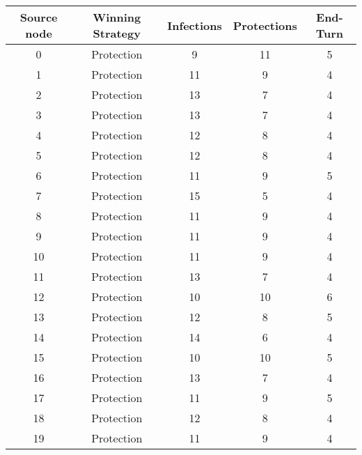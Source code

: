 \documentclass[results.tex]{subfiles}
\begin{document}
\begin{center}
  \begin{tabular}{| c || c | c | c | c |}
    \hline
    {\bfseries Source node} & {\bfseries Winning Strategy} & {\bfseries Infections} & {\bfseries Protections} & {\bfseries End-Turn} \\  %
    \hline\hline
    0 & Protection & 9 & 11 & 5 \\
    \hline
    1 & Protection & 11 & 9 & 4 \\
    \hline
    2 & Protection & 13 & 7 & 4 \\
    \hline
    3 & Protection & 13 & 7 & 4 \\
    \hline
    4 & Protection & 12 & 8 & 4 \\
    \hline
    5 & Protection & 12 & 8 & 4 \\
    \hline
    6 & Protection & 11 & 9 & 5 \\
    \hline
    7 & Protection & 15 & 5 & 4 \\
    \hline
    8 & Protection & 11 & 9 & 4 \\
    \hline
    9 & Protection & 11 & 9 & 4 \\
    \hline
    10 & Protection & 11 & 9 & 4 \\
    \hline
    11 & Protection & 13 & 7 & 4 \\
    \hline
    12 & Protection & 10 & 10 & 6 \\
    \hline
    13 & Protection & 12 & 8 & 5 \\
    \hline
    14 & Protection & 14 & 6 & 4 \\
    \hline
    15 & Protection & 10 & 10 & 5 \\
    \hline
    16 & Protection & 13 & 7 & 4 \\
    \hline
    17 & Protection & 11 & 9 & 5 \\
    \hline
    18 & Protection & 12 & 8 & 4 \\
    \hline
    19 & Protection & 11 & 9 & 4 \\
    \hline
  \end{tabular}
\end{center}
\end{document}
